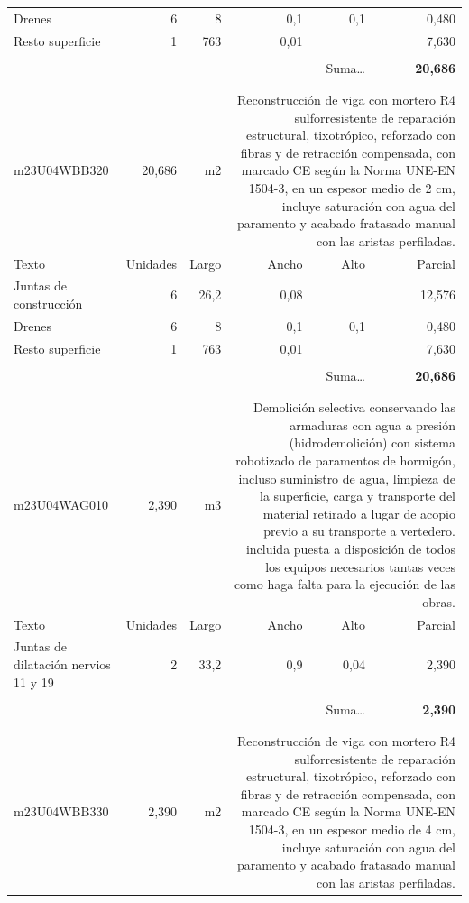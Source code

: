 \documentclass{book}%
\begin{document}
\begin{longtable}{lrrrrr}
\multicolumn{1}{p{3.5cm}}{Drenes}&6&8&0,1&0,1&     0,480\\%
\multicolumn{1}{p{3.5cm}}{Resto superficie}&1&763&0,01&&     7,630\\%
&&&&&\\%
\multicolumn{5}{r}{Suma\ldots}&\textbf{    20,686}\\%
\hline%
&&&&&\\%
&&&&&\\%
m23U04WBB320&    20,686& m2&\multicolumn{3}{p{6cm}}{\scriptsize Reconstrucción de viga con mortero R4 sulforresistente de reparación estructural, tixotrópico, reforzado con fibras y de retracción compensada, con marcado CE según la Norma UNE-EN 1504-3, en un espesor medio de 2 cm, incluye saturación con agua del paramento y acabado fratasado manual con las aristas perfiladas.\normalsize}\\%
Texto&Unidades&Largo&Ancho&Alto&Parcial\\%
\hline%
\multicolumn{1}{p{3.5cm}}{Juntas de construcción}&6&26,2&0,08&&    12,576\\%
\multicolumn{1}{p{3.5cm}}{Drenes}&6&8&0,1&0,1&     0,480\\%
\multicolumn{1}{p{3.5cm}}{Resto superficie}&1&763&0,01&&     7,630\\%
&&&&&\\%
\multicolumn{5}{r}{Suma\ldots}&\textbf{    20,686}\\%
\hline%
&&&&&\\%
&&&&&\\%
m23U04WAG010&     2,390& m3&\multicolumn{3}{p{6cm}}{\scriptsize Demolición selectiva conservando las armaduras con agua a presión (hidrodemolición) con sistema robotizado de paramentos de hormigón, incluso suministro de agua, limpieza de la superficie, carga y transporte del material retirado a lugar de acopio previo a su transporte a vertedero. incluida puesta a disposición de todos los equipos necesarios tantas veces como haga falta para la ejecución de las obras.\normalsize}\\%
Texto&Unidades&Largo&Ancho&Alto&Parcial\\%
\hline%
\multicolumn{1}{p{3.5cm}}{Juntas de dilatación nervios 11 y 19}&2&33,2&0,9&0,04&     2,390\\%
&&&&&\\%
\multicolumn{5}{r}{Suma\ldots}&\textbf{     2,390}\\%
\hline%
&&&&&\\%
&&&&&\\%
m23U04WBB330&     2,390& m2&\multicolumn{3}{p{6cm}}{\scriptsize Reconstrucción de viga con mortero R4 sulforresistente de reparación estructural, tixotrópico, reforzado con fibras y de retracción compensada, con marcado CE según la Norma UNE-EN 1504-3, en un espesor medio de 4 cm, incluye saturación con agua del paramento y acabado fratasado manual con las aristas perfiladas.\normalsize}\\%

\end{longtable}
\end{document}
